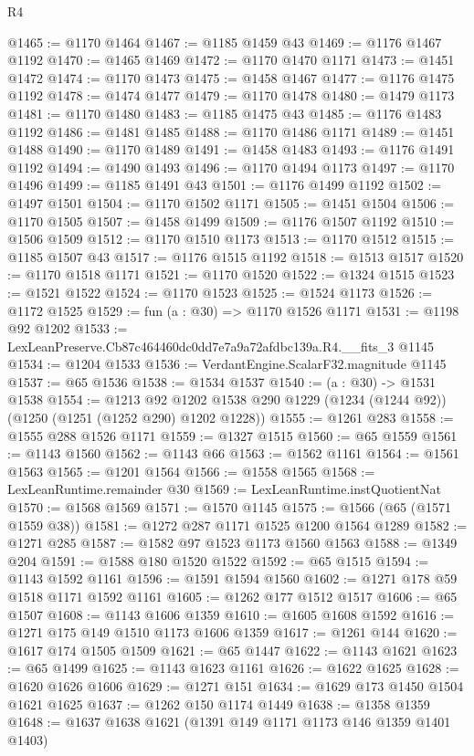 \begin{lexlean}{R4}
\begin{coremodule}
@1465 := @1170 @1464
@1467 := @1185 @1459 @43
@1469 := @1176 @1467 @1192
@1470 := @1465 @1469
@1472 := @1170 @1470 @1171
@1473 := @1451 @1472
@1474 := @1170 @1473
@1475 := @1458 @1467
@1477 := @1176 @1475 @1192
@1478 := @1474 @1477
@1479 := @1170 @1478
@1480 := @1479 @1173
@1481 := @1170 @1480
@1483 := @1185 @1475 @43
@1485 := @1176 @1483 @1192
@1486 := @1481 @1485
@1488 := @1170 @1486 @1171
@1489 := @1451 @1488
@1490 := @1170 @1489
@1491 := @1458 @1483
@1493 := @1176 @1491 @1192
@1494 := @1490 @1493
@1496 := @1170 @1494 @1173
@1497 := @1170 @1496
@1499 := @1185 @1491 @43
@1501 := @1176 @1499 @1192
@1502 := @1497 @1501
@1504 := @1170 @1502 @1171
@1505 := @1451 @1504
@1506 := @1170 @1505
@1507 := @1458 @1499
@1509 := @1176 @1507 @1192
@1510 := @1506 @1509
@1512 := @1170 @1510 @1173
@1513 := @1170 @1512
@1515 := @1185 @1507 @43
@1517 := @1176 @1515 @1192
@1518 := @1513 @1517
@1520 := @1170 @1518 @1171
@1521 := @1170 @1520
@1522 := @1324 @1515
@1523 := @1521 @1522
@1524 := @1170 @1523
@1525 := @1524 @1173
@1526 := @1172 @1525
@1529 := fun (a : @30) => @1170 @1526 @1171
@1531 := @1198 @92 @1202
@1533 := LexLeanPreserve.Cb87c464460dc0dd7e7a9a72afdbc139a.R4.__fits_3 @1145
@1534 := @1204 @1533
@1536 := VerdantEngine.ScalarF32.magnitude @1145
@1537 := @65 @1536
@1538 := @1534 @1537
@1540 := (a : @30) -> @1531 @1538
@1554 := @1213
    @92
    @1202
    @1538
    @290
    @1229
    (@1234 (@1244 @92))
    (@1250 (@1251 (@1252 @290) @1202 @1228))
@1555 := @1261 @283
@1558 := @1555 @288 @1526 @1171
@1559 := @1327 @1515
@1560 := @65 @1559
@1561 := @1143 @1560
@1562 := @1143 @66
@1563 := @1562 @1161
@1564 := @1561 @1563
@1565 := @1201 @1564
@1566 := @1558 @1565
@1568 := LexLeanRuntime.remainder @30
@1569 := LexLeanRuntime.instQuotientNat
@1570 := @1568 @1569
@1571 := @1570 @1145
@1575 := @1566 (@65 (@1571 @1559 @38))
@1581 := @1272 @287 @1171 @1525 @1200 @1564 @1289
@1582 := @1271 @285
@1587 := @1582 @97 @1523 @1173 @1560 @1563
@1588 := @1349 @204
@1591 := @1588 @180 @1520 @1522
@1592 := @65 @1515
@1594 := @1143 @1592 @1161
@1596 := @1591 @1594 @1560
@1602 := @1271 @178 @59 @1518 @1171 @1592 @1161
@1605 := @1262 @177 @1512 @1517
@1606 := @65 @1507
@1608 := @1143 @1606 @1359
@1610 := @1605 @1608 @1592
@1616 := @1271 @175 @149 @1510 @1173 @1606 @1359
@1617 := @1261 @144
@1620 := @1617 @174 @1505 @1509
@1621 := @65 @1447
@1622 := @1143 @1621
@1623 := @65 @1499
@1625 := @1143 @1623 @1161
@1626 := @1622 @1625
@1628 := @1620 @1626 @1606
@1629 := @1271 @151
@1634 := @1629 @173 @1450 @1504 @1621 @1625
@1637 := @1262 @150 @1174 @1449
@1638 := @1358 @1359
@1648 := @1637 @1638 @1621 (@1391 @149 @1171 @1173 @146 @1359 @1401 @1403)

\end{coremodule}
\end{lexlean}
